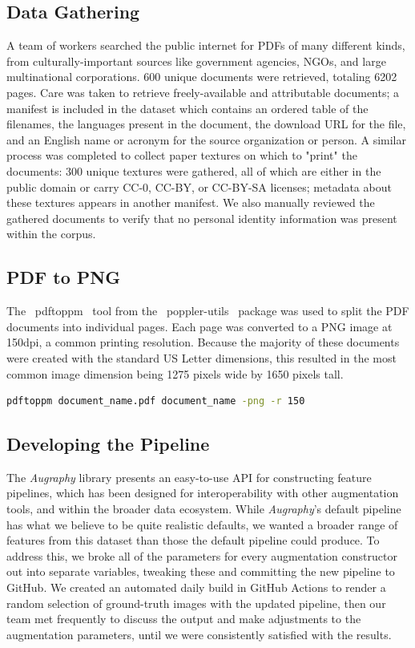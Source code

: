 \documentclass[runningheads]{llncs}
\begin{document}
\subsection{Data Gathering}
A team of workers searched the public internet for PDFs of many different kinds, from culturally-important sources like government agencies, NGOs, and large multinational corporations.
600 unique documents were retrieved, totaling 6202 pages.
Care was taken to retrieve freely-available and attributable documents; a manifest is included in the dataset which contains an ordered table of the filenames, the languages present in the document, the download URL for the file, and an English name or acronym for the source organization or person.
A similar process was completed to collect paper textures on which to "print" the documents: 300 unique textures were gathered, all of which are either in the public domain or carry CC-0, CC-BY, or CC-BY-SA licenses; metadata about these textures appears in another manifest.
We also manually reviewed the gathered documents to verify that no personal identity information was present within the corpus.

\subsection{PDF to PNG}
The ~pdftoppm~ tool from the ~poppler-utils~ package was used to split the PDF documents into individual pages.
Each page was converted to a PNG image at 150dpi, a common printing resolution.
Because the majority of these documents were created with the standard US Letter dimensions, this resulted in the most common image dimension being 1275 pixels wide by 1650 pixels tall.

\begin{lstlisting}[language=bash]
  pdftoppm document_name.pdf document_name -png -r 150
\end{lstlisting}

\subsection{Developing the Pipeline}
The \emph{Augraphy} library presents an easy-to-use API for constructing feature pipelines, which has been designed for interoperability with other augmentation tools, and within the broader data ecosystem.
While \emph{Augraphy}'s default pipeline has what we believe to be quite realistic defaults, we wanted a broader range of features from this dataset than those the default pipeline could produce.
To address this, we broke all of the parameters for every augmentation constructor out into separate variables, tweaking these and committing the new pipeline to GitHub.
We created an automated daily build in GitHub Actions to render a random selection of ground-truth images with the updated pipeline, then our team met frequently to discuss the output and make adjustments to the augmentation parameters, until we were consistently satisfied with the results.
\end{document}

